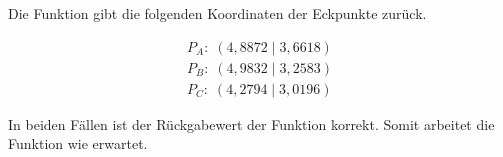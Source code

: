 Die Funktion gibt die folgenden Koordinaten der Eckpunkte zurück.

\begin{equation*}
\label{eq:unit_test_positionsbestimmung_2}
\begin{split}
P_{A}: \; (4,8872 \;|\; 3,6618)\\
P_{B}: \; (4,9832 \;|\; 3,2583)\\
P_{C}: \; (4,2794 \;|\; 3,0196)
\end{split}
\end{equation*}

In beiden Fällen ist der Rückgabewert der Funktion korrekt. Somit arbeitet die Funktion wie erwartet.






